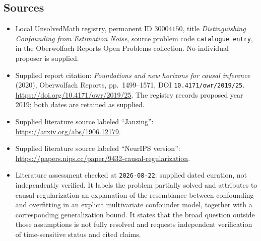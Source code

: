 \documentclass[11pt]{article}
\begin{document}
\subsection{Sources}
\begin{itemize}
\item Local UnsolvedMath registry, permanent ID \(30004150\), title \emph{Distinguishing Confounding from Estimation Noise}, source problem code \texttt{catalogue entry}, in the Oberwolfach Reports Open Problems collection. No individual proposer is supplied.
\item Supplied report citation: \emph{Foundations and new horizons for causal inference} (2020), Oberwolfach Reports, pp.\ 1499--1571, DOI \texttt{10.4171/owr/2019/25}. \url{https://doi.org/10.4171/owr/2019/25}. The registry records proposed year 2019; both dates are retained as supplied.
\item Supplied literature source labeled ``Janzing'': \url{https://arxiv.org/abs/1906.12179}.
\item Supplied literature source labeled ``NeurIPS version'': \url{https://papers.nips.cc/paper/9432-causal-regularization}.
\item Literature assessment checked at \texttt{2026-08-22}: supplied dated curation, not independently verified. It labels the problem partially solved and attributes to causal regularization an explanation of the resemblance between confounding and overfitting in an explicit multivariate confounder model, together with a corresponding generalization bound. It states that the broad question outside those assumptions is not fully resolved and requests independent verification of time-sensitive status and cited claims.
\end{itemize}
\end{document}
